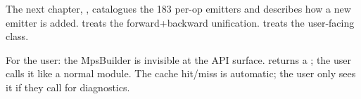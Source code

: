 The next chapter, , catalogues the 183
per-op emitters and describes how a new emitter is added.
 treats the forward+backward
unification.  treats the user-facing
 class.

\begin{lucidnote}
For the user: the MpsBuilder is invisible at the API surface.
 returns a ; the user calls
it like a normal module. The cache hit/miss is automatic; the
user only sees it if they call  for
diagnostics.
\end{lucidnote}
